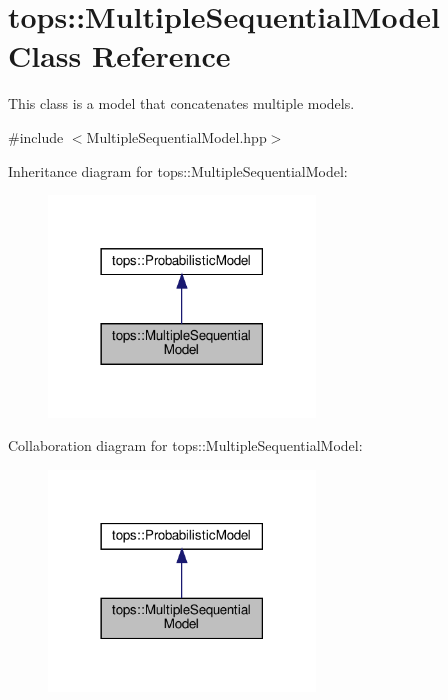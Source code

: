 \hypertarget{classtops_1_1MultipleSequentialModel}{}\section{tops\+:\+:Multiple\+Sequential\+Model Class Reference}
\label{classtops_1_1MultipleSequentialModel}


This class is a model that concatenates multiple models.  




{\ttfamily \#include $<$Multiple\+Sequential\+Model.\+hpp$>$}



Inheritance diagram for tops\+:\+:Multiple\+Sequential\+Model\+:
\nopagebreak
\begin{figure}[H]
\begin{center}
\leavevmode
\includegraphics[width=201pt]{classtops_1_1MultipleSequentialModel__inherit__graph}
\end{center}
\end{figure}


Collaboration diagram for tops\+:\+:Multiple\+Sequential\+Model\+:
\nopagebreak
\begin{figure}[H]
\begin{center}
\leavevmode
\includegraphics[width=201pt]{classtops_1_1MultipleSequentialModel__coll__graph}
\end{center}
\end{figure}
